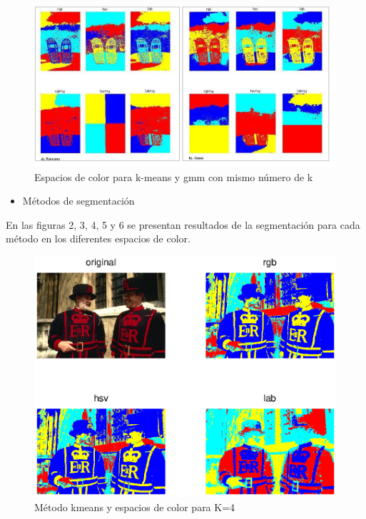 \documentclass[10pt,twocolumn,letterpaper]{article}
\begin{document}
\begin{figure}[h]
\begin{center}
   \includegraphics[scale=0.3]{pru.JPG}
\end{center}
   \caption{Espacios de color para k-means y gmm con mismo número de k }
\label{fig:long}
\label{fig:onecol}
\end{figure}
\begin{itemize}
 \item Métodos de segmentación
\end{itemize}
En las figuras 2, 3, 4, 5 y 6 se presentan resultados de la segmentación para cada método en los diferentes espacios de color.
\begin{figure}[h]
\begin{center}
   \includegraphics[scale=0.6]{kmeans1.eps}
\end{center}
   \caption{Método kmeans y espacios de color para K=4 }
\label{fig:long}
\label{fig:onecol}
\end{figure}
\end{document}
